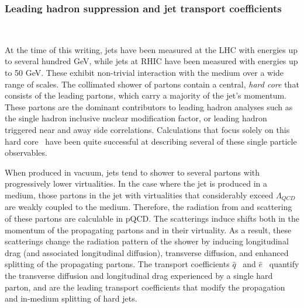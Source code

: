 \subsubsection{Leading hadron suppression and jet transport coefficients}~\label{q-hat-e-loss}

At the time of this writing, jets have been measured at the LHC with energies up to several hundred GeV, while jets at RHIC have been measured with energies up to 50 GeV.
These exhibit non-trivial interaction with the medium over a wide range of scales.  
The collimated shower of partons contain a central, \emph{hard core} that consists of the leading partons, which carry a majority of the jet's momentum.
These partons are the dominant contributors to leading hadron analyses such as the single hadron inclusive nuclear modification factor, or leading hadron triggered near and away side correlations. 
Calculations that focus solely on this hard core~\cite{Gyulassy:2000er,Arnold:2002ja,Qin:2007rn,Wang:2001ifa,Majumder:2009ge,Majumder:2011uk} 
have been quite successful at describing several of these single particle observables. 


When produced in vacuum, jets tend to shower to several partons with progressively lower virtualities. 
In the case where the jet is produced in a medium, those partons in the jet with 
virtualities that considerably exceed $\Lambda_{QCD}$ are weakly coupled to the medium. Therefore, the 
radiation from and scattering of these partons are calculable in pQCD. 
The scatterings induce shifts both in the momentum of the propagating partons and in their virtuality. As a result, these scatterings change the radiation pattern of the shower by inducing longitudinal drag (and associated longitudinal diffusion), transverse diffusion, and enhanced splitting of the propagating partons. The transport coefficients 
$\hat{q}$~\cite{Baier:2002tc} and $\hat{e}$~\cite{Majumder:2008zg} quantify the transverse diffusion and longitudinal drag experienced by a single hard parton, and are the leading transport coefficients that modify the propagation and in-medium splitting of hard jets. 


